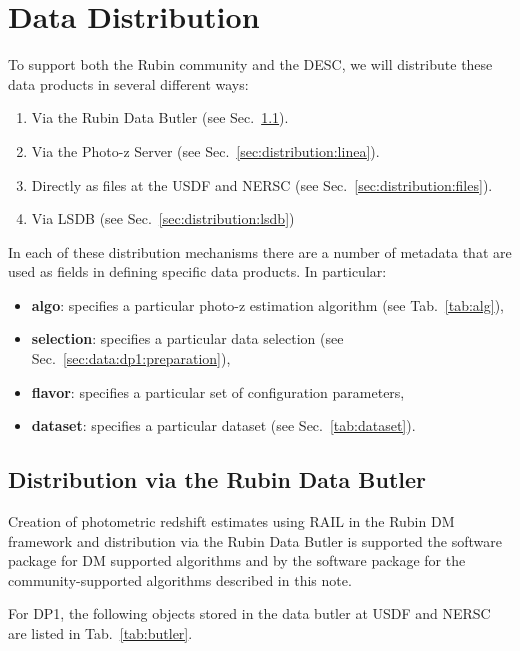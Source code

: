 \section{Data Distribution}
\label{sec:distribution:0}

To support both the Rubin community and the DESC, we will distribute these data products in several different ways:
\begin{enumerate}
\item{Via the Rubin Data Butler (see Sec.~\ref{sec:distribution:butler}).}
\item{Via the Photo-z Server (see Sec.~\ref{sec:distribution:linea}).}
\item{Directly as files at the USDF and NERSC (see Sec.~\ref{sec:distribution:files}).}
\item{Via LSDB (see Sec.~\ref{sec:distribution:lsdb})}
\end{enumerate}

In each of these distribution mechanisms there are a number of metadata that are used as fields in defining specific data products.  In particular:

\begin{itemize}
\item{\textbf{algo}: specifies a particular photo-z estimation algorithm (see Tab.~\ref{tab:alg}),}
\item{\textbf{selection}: specifies a particular data selection (see Sec.~\ref{sec:data:dp1:preparation}),}
\item{\textbf{flavor}: specifies a particular set of configuration parameters,}
\item{\textbf{dataset}: specifies a particular dataset (see Sec.~\ref{tab:dataset}).}
\end{itemize}


\subsection{Distribution via the Rubin Data Butler}
\label{sec:distribution:butler}

Creation of photometric redshift estimates using RAIL in the Rubin DM framework and distribution via the Rubin Data Butler is supported the \href{https://github.com/lsst-dm/meas_pz}{} software package for DM supported algorithms and by the \href{https://github.com/lsst-dm/meas_pz}{} software package for the community-supported algorithms described in this note.

For DP1, the following objects stored in the data butler at USDF and NERSC are listed in Tab.~\ref{tab:butler}.

